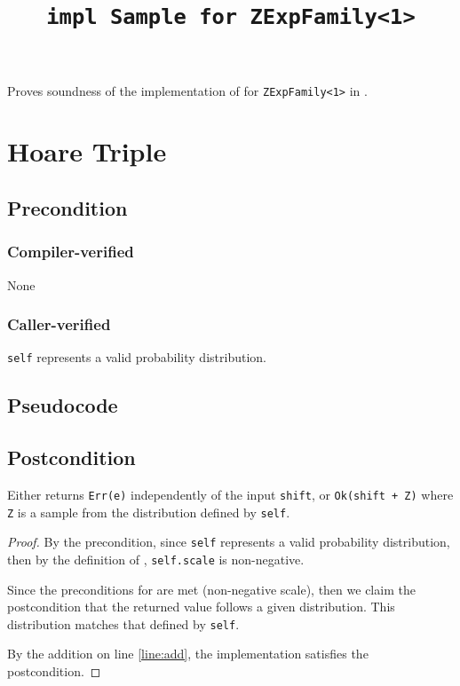 \documentclass{article}
\title{\texttt{impl Sample for ZExpFamily<1>}}
\author{\MichaelShoemateAuthor}
\date{}
\begin{document}
\maketitle
\contrib

Proves soundness of the implementation of  for \texttt{ZExpFamily<1>} in .

\section{Hoare Triple}
\subsection*{Precondition}
\subsubsection*{Compiler-verified}
None

\subsubsection*{Caller-verified}
\texttt{self} represents a valid probability distribution.

\subsection*{Pseudocode}


\subsection*{Postcondition}
\begin{theorem}
    \label{postcondition}
    Either returns \texttt{Err(e)} independently of the input \texttt{shift},
    or \texttt{Ok(shift + Z)} where \texttt{Z} is a sample from the distribution defined by \texttt{self}.
\end{theorem}

\begin{proof}
    By the precondition, since \texttt{self} represents a valid probability distribution,
    then by the definition of ,
    \texttt{self.scale} is non-negative.

    Since the preconditions for  are met (non-negative scale),
    then we claim the postcondition that the returned value follows a given distribution.
    This distribution matches that defined by \texttt{self}.

    By the addition on line \ref{line:add}, the implementation satisfies the postcondition.
\end{proof}
\end{document}
